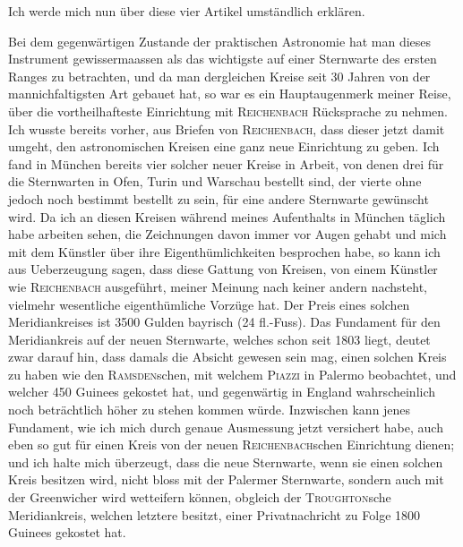 Ich werde mich nun über diese vier Artikel umständlich erklären.
\begin{center}\end{center}
\noindent\hspace*{\parindent}Bei dem gegenwärtigen Zustande der praktischen Astronomie hat man dieses Instrument gewissermaassen als das wichtigste auf einer Sternwarte des ersten Ranges zu betrachten, und da man dergleichen Kreise seit 30 Jahren von der mannichfaltigsten Art gebauet hat, so war es ein Hauptaugenmerk meiner Reise, über die vortheilhafteste Einrichtung mit \textsc{Reichenbach} Rücksprache zu nehmen. Ich wusste bereits vorher, aus Briefen von \textsc{Reichenbach}, dass dieser jetzt damit umgeht, den astronomischen Kreisen eine ganz neue Einrichtung zu geben. Ich fand in München bereits vier solcher neuer Kreise in Arbeit, von denen drei für die Sternwarten in Ofen, Turin und Warschau bestellt sind, der vierte ohne jedoch noch bestimmt bestellt zu sein, für eine andere Sternwarte gewünscht wird. Da ich an diesen Kreisen während meines Aufenthalts in München täglich habe arbeiten sehen, die Zeichnungen davon immer vor Augen gehabt und mich mit dem Künstler über ihre Eigenthümlichkeiten besprochen habe, so kann ich aus Ueberzeugung sagen, dass diese Gattung von Kreisen, von einem Künstler wie \textsc{Reichenbach} ausgeführt, meiner Meinung nach keiner andern nachsteht, vielmehr wesentliche eigenthümliche Vorzüge hat. Der Preis eines solchen Meridiankreises ist 3500 Gulden bayrisch (24 fl.-Fuss). Das Fundament für den Meridiankreis auf der neuen Sternwarte, welches schon seit 1803 liegt, deutet zwar darauf hin, dass damals die Absicht gewesen sein mag, einen solchen Kreis zu haben wie den \textsc{Ramsden}schen, mit welchem \textsc{Piazzi} in Palermo beobachtet, und welcher 450 Guinees gekostet hat, und gegenwärtig in England wahrscheinlich noch beträchtlich
\clearpage{}
\noindent höher zu stehen kommen würde. Inzwischen kann jenes Fundament, wie ich mich durch genaue Ausmessung jetzt versichert habe, auch eben so gut für einen Kreis von der neuen \textsc{Reichenbach}schen Einrichtung dienen; und ich halte mich überzeugt, dass die neue Sternwarte, wenn sie einen solchen Kreis besitzen wird, nicht bloss mit der Palermer Sternwarte, sondern auch mit der Greenwicher  wird wetteifern können, obgleich der \textsc{Troughton}sche Meridiankreis, welchen letztere besitzt, einer Privatnachricht zu Folge 1800 Guinees gekostet hat.

